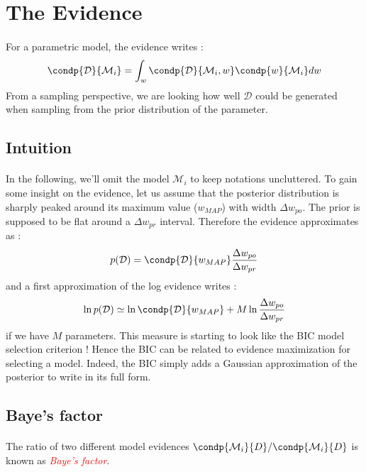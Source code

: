 \documentclass[a4paper]{article}
\begin{document}
	\section{The Evidence}
	{
		\paragraph{} For a parametric model, the evidence writes : 
		\begin{equation}
			\condp{\mathcal{D}}{\mathcal{M}_i} = \int_w \condp{\mathcal{D}}{\mathcal{M}_i,w}\condp{w}{\mathcal{M}_i}dw
		\end{equation}
		From a sampling perspective, we are looking how well $\mathcal{D}$ could be generated when sampling from the prior distribution of the parameter. 
		
		\subsection{Intuition}
		{
			\paragraph{} In the following, we'll omit the model $\mathcal{M}_i$ to keep notations uncluttered. To gain some insight on the evidence, let us assume that the posterior distribution is sharply peaked around its maximum value ($w_{MAP}$) with width $\Delta w_{po}$. The prior is supposed to be flat around a $\Delta w_{pr}$ interval. Therefore the evidence approximates as : 
			\begin{equation}
				p(\mathcal{D}) = \condp{\mathcal{D}}{w_{MAP}}\frac{\Delta w_{po}}{\Delta w_{pr}}
			\end{equation}
			and a first approximation of the log evidence writes : 
			\begin{equation}
			 	\ln{p(\mathcal{D})} \simeq \ln{\condp{\mathcal{D}}{w_{MAP}}} + M\ln{\frac{\Delta w_{po}}{\Delta w_{pr}}}
			\end{equation}
			if we have $M$ parameters. This measure is starting to look like the BIC model selection criterion ! Hence the BIC can be related to evidence maximization for selecting a model. Indeed, the BIC simply adds a Gaussian approximation of the posterior to write in its full form. 
		}
		\subsection{Baye's factor}
		{
			\paragraph{} The ratio of two different model evidences $\condp{\mathcal{M}_i}{D}/\condp{\mathcal{M}_i}{D}$ is known as \emph{\textcolor{red}{Baye's factor}}. 
			
}}
\end{document}
